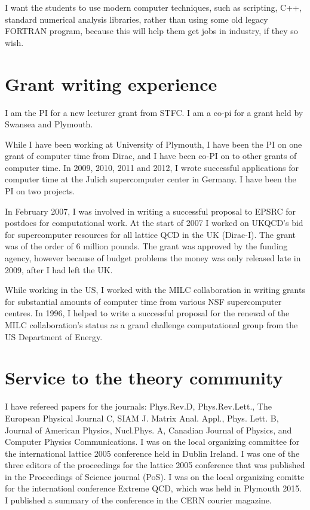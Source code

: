 \documentclass[12pt]{article}
\begin{document}
I want the students to use modern computer
techniques, such as scripting, C++, standard numerical
analysis libraries, rather than using some old legacy
FORTRAN program, because this will help them 
get jobs in industry, if they so wish.


\section{Grant writing experience} 

I am the PI for  a new lecturer grant from STFC. I am
a co-pi for a grant held by Swansea and Plymouth.

While I have been working  at University of Plymouth, I have been
the PI on one grant of computer time from Dirac, and I have been
co-PI on to other grants of computer time.
In 2009, 2010, 2011
and 2012,
I wrote successful applications for computer time at the Julich
supercomputer center in Germany. I have been the PI on two projects.

In February 2007, I was involved in writing a successful proposal to
EPSRC for postdocs for computational work.  At the start of 2007 I
worked on UKQCD's bid for supercomputer resources for all lattice QCD
in the UK (Dirac-I). The grant was of the order of 6 million
pounds. The grant was approved by the funding agency, however because
of budget problems the money was only released late in 2009, after I
had left the UK.


While working in the US,
I worked with the MILC collaboration in writing grants for
substantial amounts of computer time from various NSF supercomputer
centres. In 1996, I helped to write a successful proposal for the
renewal of the MILC collaboration's status as a grand challenge
computational group from the US Department of Energy. 


\section{Service to the theory community}

I have refereed papers for the journals: Phys.Rev.D, Phys.Rev.Lett.,
The European Physical Journal C, SIAM J. Matrix Anal. Appl.,
Phys. Lett. B, Journal of American Physics, Nucl.Phys. A, 
Canadian Journal of Physics,
and 
Computer Physics Communications.
I was on the local
organizing committee for the international lattice 2005 conference
held in Dublin Ireland. I was one of the three editors of the
proceedings for the lattice 2005 conference that was published in the
Proceedings of Science journal (PoS). I was on the local organizing
comitte for the internationl conference Extreme QCD, which was held
in Plymouth 2015. I published a summary of the conference in the CERN 
courier magazine.
\end{document}
